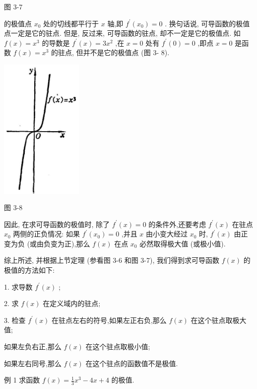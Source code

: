 \documentclass[10pt]{article}
\begin{document}
图 3-7

的极值点 \({x}_{0}\) 处的切线都平行于 \(x\) 轴,即 \({f}^{\prime }\left( {x}_{0}\right) = 0\) . 换句话说, 可导函数的极值点一定是它的驻点. 但是, 反过来, 可导函数的驻点, 却不一定是它的极值点. 如 \(f\left( x\right) = {x}^{3}\) 的导数是 \({f}^{\prime }\left( x\right) = 3{x}^{2}\) ,在 \(x = 0\) 处有 \({f}^{\prime }\left( 0\right) = 0\) ,即点 \(x = 0\) 是函数 \(f\left( x\right) = {x}^{3}\) 的驻点, 但并不是它的极值点 (图 3- 8).

\begin{center}
\includegraphics[max width=0.3\textwidth]{images/01912c18-5c3f-733d-b775-749ba9897a9d_141_203287.jpg}
\end{center}

图 3-8

因此, 在求可导函数的极值时, 除了 \({f}^{\prime }\left( x\right) = 0\) 的条件外,还要考虑 \({f}^{\prime }\left( x\right)\) 在驻点 \({x}_{0}\) 两侧的正负情况: 如果 \({f}^{\prime }\left( {x}_{0}\right) = 0\) ,并且 \(x\) 由小变大经过 \({x}_{0}\) 时, \({f}^{\prime }\left( x\right)\) 由正变为负 (或由负变为正),那么 \(f\left( x\right)\) 在点 \({x}_{0}\) 必然取得极大值 (或极小值).

综上所述, 并根据上节定理 (参看图 3-6 和图 3-7), 我们得到求可导函数 \(f\left( x\right)\) 的极值的方法如下:

1. 求导数 \({f}^{\prime }\left( x\right)\) ;

2. 求 \(f\left( x\right)\) 在定义域内的驻点;

3. 检查 \({f}^{\prime }\left( x\right)\) 在驻点左右的符号,如果左正右负,那么 \(f\left( x\right)\) 在这个驻点取极大值;

如果左负右正,那么 \(f\left( x\right)\) 在这个驻点取极小值;

如果左右同号,那么 \(f\left( x\right)\) 在这个驻点的函数值不是极值.

例 1 求函数 \(f\left( x\right) = \frac{1}{3}{x}^{3} - {4x} + 4\) 的极值.
\end{document}
